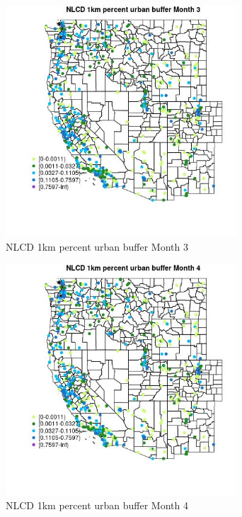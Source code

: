 \begin{figure} 
\centering  
\includegraphics[width=0.77\textwidth]{Code_Outputs/Report_ML_input_PM25_Step4_part_e_de_duplicated_aves_compiled_2019-05-14wNAs_MapObsMo3NLCD_1km_percent_urban_buffer.jpg} 
\caption{\label{fig:Report_ML_input_PM25_Step4_part_e_de_duplicated_aves_compiled_2019-05-14wNAsMapObsMo3NLCD_1km_percent_urban_buffer}NLCD 1km percent urban buffer Month 3} 
\end{figure} 
 

\begin{figure} 
\centering  
\includegraphics[width=0.77\textwidth]{Code_Outputs/Report_ML_input_PM25_Step4_part_e_de_duplicated_aves_compiled_2019-05-14wNAs_MapObsMo4NLCD_1km_percent_urban_buffer.jpg} 
\caption{\label{fig:Report_ML_input_PM25_Step4_part_e_de_duplicated_aves_compiled_2019-05-14wNAsMapObsMo4NLCD_1km_percent_urban_buffer}NLCD 1km percent urban buffer Month 4} 
\end{figure} 
 

